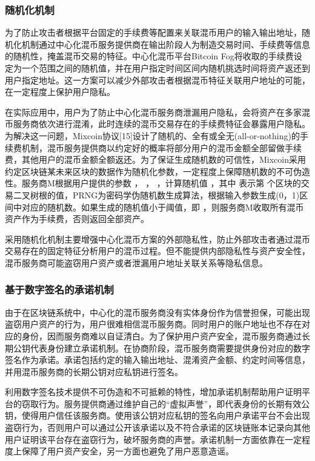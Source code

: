 \subsubsection{随机化机制}

为了防止攻击者根据平台固定的手续费等配置来关联混币用户的输入输出地址，随机化机制通过中心化混币服务提供商在输出阶段人为制造交易时间、手续费等信息的随机性，掩盖混币交易的特征。中心化混币平台Bitcoin Fog将收取的手续费设定为一个范围之间的随机值，并在用户指定时间区间内随机挑选时间将资产返还到用户指定地址。这一方案可以减少外部攻击者根据混币特征关联用户地址的可能，在一定程度上保护用户隐私。

在实际应用中，用户为了防止中心化混币服务商泄漏用户隐私，会将资产在多家混币服务商依次进行混淆，此时连续的混币交易存在的手续费特征会暴露用户隐私。为解决这一问题，Mixcoin协议[15]设计了随机的、全有或全无(all-or-nothing)的手续费机制，混币服务提供商以约定好的概率将部分用户的混币金额全部留做手续费，其他用户的混币金额全额返还。为了保证生成随机数的可信性，Mixcoin采用约定区块链某未来区块的数据作为随机化参数，一定程度上保障随机数的不可伪造性。服务商M根据用户提供的参数 ， ， ，计算随机值 ，其中 表示第 个区块的交易二叉树根的值，PRNG为密码学伪随机数生成算法，根据输入参数生成(0，1)区间中对应的随机数。如果生成的随机值小于阈值，即 ，则服务商M收取所有混币资产作为手续费，否则返回全部资产。

采用随机化机制主要增强中心化混币方案的外部隐私性，防止外部攻击者通过混币交易存在的固定特征分析用户的混币过程。但不能提供内部隐私性与资产安全性，混币服务商可能盗窃用户资产或者泄漏用户地址关联关系等隐私信息。

\subsubsection{基于数字签名的承诺机制}

由于在区块链系统中，中心化的混币服务商没有实体身份作为信誉担保，可能出现盗窃用户资产的行为，用户很难相信混币服务商。同时用户的账户地址也不存在对应的身份，因而服务商难以自证清白。为了保护用户资产安全，混币服务商通过长期公钥代表身份建立承诺机制。在协商阶段，混币服务商需要提供身份对应的数字签名作为承诺。承诺包括约定的输入输出地址、混淆资产金额、约定时间等信息，并用混币服务商的长期公钥对应私钥进行签名。
	
利用数字签名技术提供不可伪造和不可抵赖的特性，增加承诺机制帮助用户证明平台的窃取行为。服务提供商通过维护自己的“虚拟声誉”，即代表身份的长期有效公钥，使得用户信任该服务商。使用该公钥对应私钥的签名向用户承诺平台不会出现盗窃行为，否则用户可以通过公开该承诺以及不符合承诺的区块链账本记录向其他用户证明该平台存在盗窃行为，破坏服务商的声誉。承诺机制一方面依靠在一定程度上保障了用户资产安全，另一方面也避免了用户恶意造谣。

